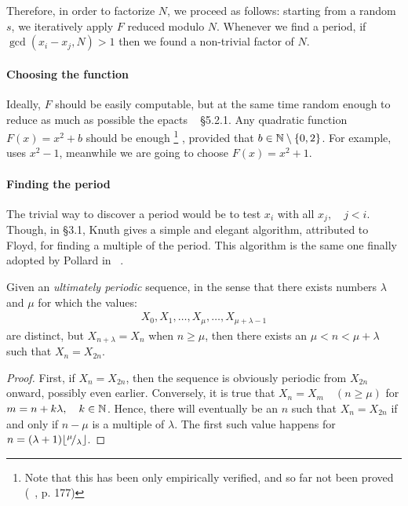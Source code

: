 Therefore, in order to factorize $N$, we proceed as follows: starting from a
random $s$, we iteratively apply $F$ reduced modulo $N$. Whenever we find a
period, if $\gcd(x_i - x_j, N) > 1$ then we found a non-trivial
factor of $N$.

\paragraph{Choosing the function} Ideally, $F$ should be easily computable, but
at the same time random enough to reduce as much as possible the epacts
~\cite{Crandall} \S 5.2.1. Any quadratic function $F(x) = x^2 + b$ should be
enough \footnote{
  Note that this has been only empirically verified, and so far not been proved
  (~\cite{riesel}, p. 177)}
, provided that $b \in \mathbb{N} \setminus \{0, 2\}$.
For example, ~\cite{pollardMC} uses $x^2 -1$, meanwhile we are going to choose
$F(x) = x^2 + 1$.

\paragraph{Finding the period} The trivial way to discover a period would be to
test $x_i$ with all $x_j, \quad j < i$. Though, in \cite{AOCPv2} \S 3.1,
Knuth gives a simple and elegant algorithm, attributed to Floyd, for finding a
multiple of the period.
This algorithm is the same one finally adopted by Pollard in
~\cite{pollardMC}.

\begin{theorem*}[Floyd]
Given an \emph{ultimately periodic} sequence, in the sense that there exists
numbers $\lambda$ and $\mu$ for which the values:
\begin{align*}
  X_0, X_1, \ldots, X_{\mu}, \ldots, X_{\mu + \lambda - 1}
\end{align*}
are distinct, but $X_{n+\lambda} = X_n$ when $n \geq \mu$,
then there exists an
$\mu < n < \mu + \lambda$ such that $X_n = X_{2n}$.
\end{theorem*}

\begin{proof}
  First, if $X_n = X_{2n}$, then the sequence is obviously periodic from
  $X_{2n}$ onward, possibly even earlier.
  Conversely, it is true that $X_n = X_m \quad (n \geq \mu)$ for
  $m = n + k\lambda, \quad k \in \mathbb{N}$. Hence, there will eventually
  be an $n$ such that $X_n = X_{2n}$ if and only if $n - \mu$ is a multiple of
  $\lambda$.
  The first such value happens for $n = (\lambda + 1)\lfloor{}^{\mu}\!/_{\lambda}\rfloor$.
\end{proof}

